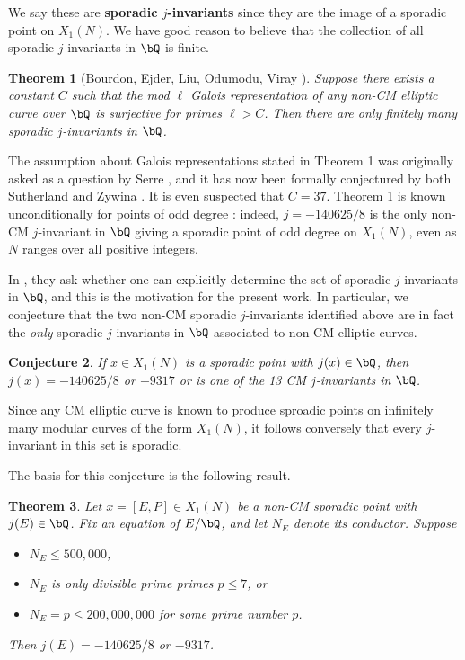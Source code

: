 \documentclass[11pt,reqno]{amsart}
\theoremstyle{plain}
\newtheorem{theorem}{Theorem}%
\newtheorem{conjecture}[theorem]{Conjecture}
\theoremstyle{definition}
\newcommand{\Q}{\bQ}
\begin{document}
We say these are \textbf{sporadic $j$-invariants} since they are the image of a sporadic point on $X_1(N)$. We have good reason to believe that the collection of all sporadic $j$-invariants in $\Q$ is finite.
\begin{theorem}[Bourdon, Ejder, Liu, Odumodu, Viray \cite{BELOV}]
Suppose there exists a constant $C$ such that the mod $\ell$ Galois representation of any non-CM elliptic curve over $\Q$ is surjective for primes $\ell>C$. Then there are only finitely many sporadic $j$-invariants in $\Q$.
\end{theorem}

\noindent The assumption about Galois representations stated in Theorem 1 was originally asked as a question by Serre \cite{serre72}, and it has now been formally conjectured by both Sutherland \cite{sutherland} and Zywina \cite{ZywinaImages}. It is even suspected that $C=37$. Theorem 1 is known unconditionally for points of odd degree \cite{OddDeg}: indeed, $j=-140625/8$ is the only non-CM $j$-invariant in $\Q$ giving a sporadic point of odd degree on $X_1(N)$, even as $N$ ranges over all positive integers. 

In \cite{BELOV}, they ask whether one can explicitly determine the set of sporadic $j$-invariants in $\Q$, and this is the motivation for the present work. In particular, we conjecture that the two non-CM sporadic $j$-invariants identified above are in fact the \emph{only} sporadic $j$-invariants in $\Q$ associated to non-CM elliptic curves. 

\begin{conjecture}
If $x\in X_1(N)$ is a sporadic point with $j(x) \in \Q$, then $j(x)=-140625/8$ or $-9317$ or is one of the 13 CM $j$-invariants in $\Q$. 
\end{conjecture}

\noindent Since any CM elliptic curve is known to produce sproadic points on infinitely many modular curves of the form $X_1(N)$, it follows conversely that every $j$-invariant in this set is sporadic.

The basis for this conjecture is the following result.

\begin{theorem}
Let $x=[E,P]\in X_1(N)$ be a non-CM sporadic point with $j(E) \in \Q$. Fix an equation of $E/\Q$, and let $N_E$ denote its conductor. Suppose
\begin{itemize}
\item$N_E \leq 500{,}000$,
\item $N_E$ is only divisible prime primes $p \leq 7$, or
\item $N_E=p \leq 200{,}000{,}000$ for some prime number $p$.
\end{itemize}
Then $j(E) =-140625/8$ or $-9317$.
\end{theorem}
\end{document}
